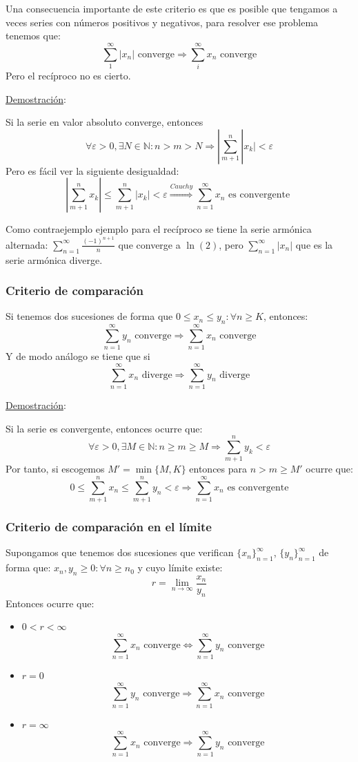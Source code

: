 \documentclass[10pt,a4paper,openright]{book}
\begin{document}
Una consecuencia importante de este criterio es que es posible que tengamos a veces series con números positivos y negativos, para resolver ese problema tenemos que:
$$\sum_{1}^{\infty} |x_n|\mbox{ converge}\Rightarrow \sum_{i}^{\infty} x_n\mbox{ converge}$$
Pero el recíproco no es cierto.

\underline{Demostración}:

Si la serie en valor absoluto converge, entonces
$$\forall \varepsilon > 0, \exists N \in \mathbb{N}: n > m > N \Rightarrow |\sum_{m+1}^{n} |x_k| < \varepsilon$$
Pero es fácil ver la siguiente desigualdad:
$$\left|\sum_{m+1}^{n} x_k\right| \leq \sum_{m+1}^{n} \left|x_k\right|  < \varepsilon \overset{Cauchy}{\Rightarrow} \sum_{n=1}^{\infty} x_n \mbox{ es convergente }$$

Como contraejemplo ejemplo para el recíproco se tiene la serie armónica alternada: $\sum_{n=1}^{\infty} \frac{(-1)^{n+1}}{n}$ que converge a $\ln(2)$, pero $\sum_{n=1}^{\infty} |x_n|$ que es la serie armónica diverge.

\subsubsection*{Criterio de comparación}
Si tenemos dos sucesiones de forma que $0 \leq x_n \leq y_n: \forall n \geq K$, entonces:
$$\sum_{n=1}^{\infty} y_n \mbox{ converge} \Rightarrow \sum_{n = 1}^{\infty} x_n \mbox{ converge}$$
Y de modo análogo se tiene que si
$$\sum_{n=1}^{\infty} x_n\mbox{ diverge}\Rightarrow \sum_{n = 1}^{\infty} y_n \mbox{ diverge}$$

\underline{Demostración}:

Si la serie es convergente, entonces ocurre que:
$$\forall \varepsilon > 0, \exists M \in \mathbb{N}: n \geq m \geq M \Rightarrow \sum_{m+1}^{n} y_k	< \varepsilon$$
Por tanto, si escogemos $M'=\min\{M,K\}$ entonces para $n>m\geq M'$ ocurre que:
$$0 \leq \sum_{m+1}^{n} x_n \leq \sum_{m+1}^{n} y_n < \varepsilon \Rightarrow \sum_{n=1}^{\infty} x_n\mbox{ es convergente}$$


\subsubsection*{Criterio de comparación en el límite}
Supongamos que tenemos dos sucesiones que verifican $\{x_n\}_{n=1}^\infty$, $\{y_n\}_{n=1}^\infty$ de forma que: $x_n , y_n \geq 0 : \forall n \geq n_0$ y cuyo límite existe:
$$r = \lim_{n \rightarrow \infty} \frac{x_n}{y_n}$$
Entonces ocurre que:
\begin{itemize}
\item $0< r <\infty$
$$\sum_{n=1}^{\infty} x_n \mbox{ converge} \Leftrightarrow \sum_{n=1}^{\infty} y_n \mbox{ converge}$$
\item $r = 0$
$$\sum_{n=1}^{\infty} y_n \mbox{ converge} \Rightarrow \sum_{n=1} ^{\infty} x_n \mbox{ converge}$$
\item $r= \infty$
$$\sum_{n=1}^{\infty} x_n \mbox{ converge} \Rightarrow \sum_{n=1} ^{\infty} y_n \mbox{ converge}$$
\end{itemize}
\end{document}
